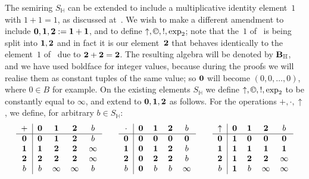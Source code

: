 \documentclass[eqnor,reqno]{amsart}
\theoremstyle{plain}
\theoremstyle{definition}
\newcommand{\cc}{\mathbin{\textup{\copyright}}}
\begin{document}
The semiring $S_\mathbb{H}$ can be extended to include a multiplicative identity element~$1$ with $1+1=1$, as discussed at~\cite[p.~226]{JRZ}.  We wish to make a different amendment to include ${\bf 0},{\bf 1},{\bf 2}:={\bf 1}+{\bf 1}$, and to define $\uparrow,\cc,!,\exp_2$; note that the~$1$ of~\cite{JRZ} is being split into ${\bf 1}, {\bf 2}$ and in fact it is our element~${\bf 2}$ that behaves identically to the element~$1$ of~\cite{JRZ} due to ${\bf 2}+{\bf 2}={\bf 2}$.  The resulting algebra will be denoted by ${\bf B}_\mathbb{H}$, and we have used boldface for integer values, because during the proofs we will realise them as constant tuples of the same value; so ${\bf 0}$ will become $(0,0,\dots,0)$, where $0\in B$ for example.  On the existing elements $S_\mathbb{H}$ we define $\uparrow,\cc,!,\exp_2$ to be constantly equal to $\infty$, and extend to ${\bf 0},{\bf 1},{\bf 2}$ as follows.  For the operations $+,\cdot,\uparrow$, we define, for arbitrary $b\in S_{\mathbb{H}}$:
\[
\begin{tabular}{c|cccc}
$+$&${\bf 0}$&${\bf 1}$&${\bf 2}$&$b$\\
\hline
${\bf 0}$&${\bf 0}$&${\bf 1}$&${\bf 2}$&$b$\\
${\bf 1}$&${\bf 1}$&${\bf 2}$&${\bf 2}$&$\infty$\\
${\bf 2}$&${\bf 2}$&${\bf 2}$&${\bf 2}$&$\infty$\\
$b$&$b$&$\infty$&$\infty$&$b$\\
\end{tabular}\qquad
\begin{tabular}{c|cccc}
$\cdot$&${\bf 0}$&${\bf 1}$&${\bf 2}$&$b$\\
\hline
${\bf 0}$&${\bf 0}$&${\bf 0}$&${\bf 0}$&${\bf 0}$\\
${\bf 1}$&${\bf 0}$&${\bf 1}$&${\bf 2}$&$b$\\
${\bf 2}$&${\bf 0}$&${\bf 2}$&${\bf 2}$&$b$\\
$b$&${\bf 0}$&$b$&$b$&$\infty$\\
\end{tabular}\qquad
\begin{tabular}{c|cccc}
$\uparrow$&${\bf 0}$&${\bf 1}$&${\bf 2}$&$b$\\
\hline
${\bf 0}$&${\bf 1}$&${\bf 0}$&${\bf 0}$&${\bf 0}$\\
${\bf 1}$&${\bf 1}$&${\bf 1}$&${\bf 1}$&${\bf 1}$\\
${\bf 2}$&${\bf 1}$&${\bf 2}$&${\bf 2}$&$\infty$\\
$b$&${\bf 1}$&$b$&$\infty$&$\infty$\\
\end{tabular}
\]
\end{document}
